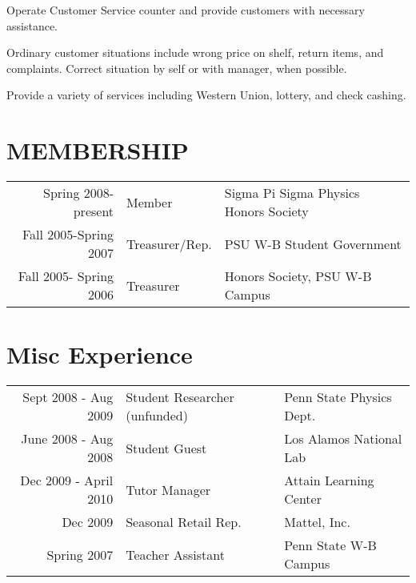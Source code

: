 \documentclass[]{deedy-resume-openfont}
\begin{document}
\begin{minipage}[t]{0.66\textwidth}
\begin{tightemize}
\item Operate Customer Service counter and provide customers with necessary assistance.
\item Ordinary customer situations include wrong price on shelf, return items, and complaints. Correct situation by self or with manager, when possible.
\item Provide a variety of services including Western Union, lottery, and check cashing.
\end{tightemize}
\sectionsep



\section {MEMBERSHIP}
\begin{tabular}{rll}
Spring 2008- present & Member & Sigma Pi Sigma Physics Honors Society\\
Fall 2005-Spring 2007 & Treasurer/Rep. &  PSU W-B Student Government\\  
Fall 2005- Spring 2006 & Treasurer & Honors Society, PSU W-B Campus\\
\end{tabular}
\sectionsep



\section {Misc Experience}
\begin{tabular}{rll}

Sept 2008 - Aug 2009 & Student Researcher (unfunded) & Penn State Physics Dept.\\
June 2008 - Aug 2008 & Student Guest & Los Alamos National Lab \\
Dec 2009 - April 2010 & Tutor Manager & Attain Learning Center\\ 
Dec 2009 & Seasonal Retail Rep. & Mattel, Inc.\\
Spring 2007 & Teacher Assistant & Penn State W-B Campus\\

\end{tabular}

\sectionsep

\end{minipage} 
\end{document}
